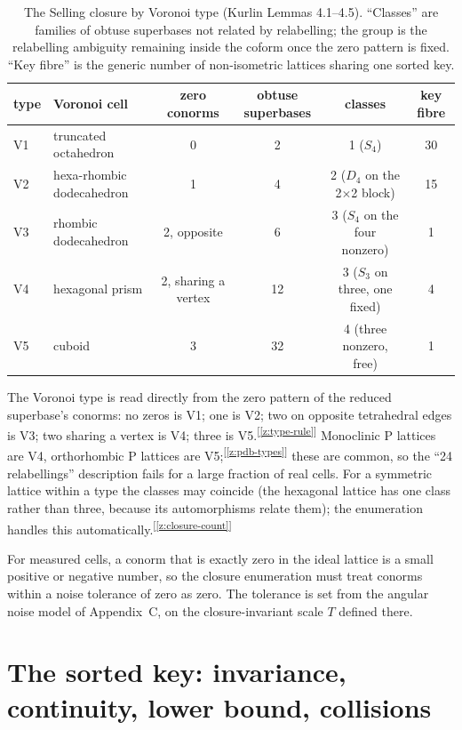 \documentclass[11pt]{article}
\newcommand{\chk}[1]{\textsuperscript{[\ref{#1}]}}
\begin{document}
\begin{table}[h]
\centering
\caption{The Selling closure by Voronoi type (Kurlin Lemmas 4.1--4.5). ``Classes'' are families of obtuse superbases not related by relabelling; the group is the relabelling ambiguity remaining inside the coform once the zero pattern is fixed. ``Key fibre'' is the generic number of non-isometric lattices sharing one sorted key.}
\label{tab:closure}
\begin{tabular}{llcccc}
\toprule
type & Voronoi cell & zero conorms & obtuse superbases & classes & key fibre \\
\midrule
V1 & truncated octahedron & 0 & 2 & 1 ($S_4$) & 30 \\
V2 & hexa-rhombic dodecahedron & 1 & 4 & 2 ($D_4$ on the 2$\times$2 block) & 15 \\
V3 & rhombic dodecahedron & 2, opposite & 6 & 3 ($S_4$ on the four nonzero) & 1 \\
V4 & hexagonal prism & 2, sharing a vertex & 12 & 3 ($S_3$ on three, one fixed) & 4 \\
V5 & cuboid & 3 & 32 & 4 (three nonzero, free) & 1 \\
\bottomrule
\end{tabular}
\end{table}

The Voronoi type is read directly from the zero pattern of the reduced superbase's conorms: no zeros is V1; one is V2; two on opposite tetrahedral edges is V3; two sharing a vertex is V4; three is V5.\chk{z:type-rule} Monoclinic P lattices are V4, orthorhombic P lattices are V5;\chk{z:pdb-types} these are common, so the ``24 relabellings'' description fails for a large fraction of real cells. For a symmetric lattice within a type the classes may coincide (the hexagonal lattice has one class rather than three, because its automorphisms relate them); the enumeration handles this automatically.\chk{z:closure-count}

For measured cells, a conorm that is exactly zero in the ideal lattice is a small positive or negative number, so the closure enumeration must treat conorms within a noise tolerance of zero as zero. The tolerance is set from the angular noise model of Appendix~C, on the closure-invariant scale $T$ defined there.

\section{The sorted key: invariance, continuity, lower bound, collisions}
\label{app:key}
\end{document}
